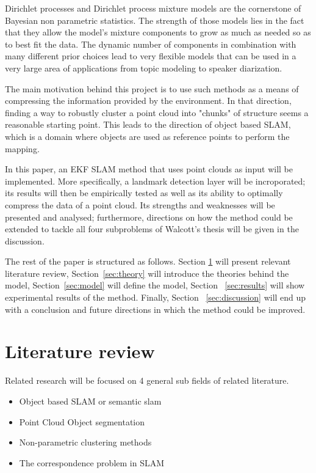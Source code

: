 \documentclass[twoside,hidelinks]{article}
\begin{document}
Dirichlet processes and Dirichlet process mixture models \cite{nonParam} are the cornerstone of Bayesian non parametric statistics. The strength of those models lies in the fact that they allow the model's mixture components to grow as much as needed so as to best fit the data. The dynamic number of components in combination with many different prior choices lead to very flexible models that can be used in a very large area of applications from topic modeling\cite{LDA} to speaker diarization\cite{speakerDiar}. 

The main motivation behind this project is to use such methods as a means of compressing the information provided by the environment. In that direction, finding a way to robustly cluster a point cloud into "chunks" of structure seems a reasonable starting point. This leads to the direction of object based SLAM, which is a domain where objects are used as reference points to perform the mapping.

In this paper, an EKF SLAM method that uses point clouds as input will be implemented. More specifically, a landmark detection layer will be incroporated; its results will then be empirically tested as well as its ability to optimally compress the data of a point cloud. Its strengths and weaknesses will be presented and analysed; furthermore, directions on how the method could be extended to tackle all four subproblems of Walcott's thesis will be given in the discussion.

The rest of the paper is structured as follows. Section \ref{sec:literature} will present relevant literature review, Section~\ref{sec:theory} will introduce the theories behind the model, Section~\ref{sec:model} will define the model, Section ~\ref{sec:results} will show experimental results of the method. Finally, Section ~\ref{sec:discussion} will end up with a conclusion and future directions in which the method could be improved.

 
\section{Literature review}
\label{sec:literature}

Related research will be focused on 4 general sub fields of related literature.
\begin{itemize}
	\item Object based SLAM or semantic slam
	\item Point Cloud Object segmentation
	\item Non-parametric clustering methods
	\item The correspondence problem in SLAM
\end{itemize}
\end{document}
